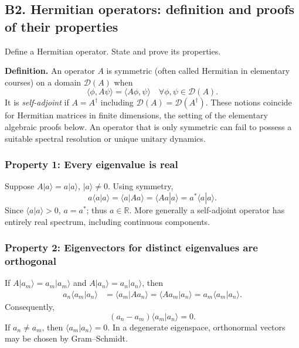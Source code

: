 \documentclass[11pt,a4paper]{article}
\newcommand{\Dom}{\mathcal D}
\newcommand{\R}{\mathbb R}
\begin{document}
\subsection{B2. Hermitian operators: definition and proofs of their properties}
\begin{questionbox}Define a Hermitian operator. State and prove its properties.\end{questionbox}
\textbf{Definition.} An operator $A$ is symmetric (often called Hermitian in elementary courses) on a domain $\Dom(A)$ when
\begin{equation}\label{eq:hermitian}
\langle\phi,A\psi\rangle=\langle A\phi,\psi\rangle
\quad\forall\phi,\psi\in\Dom(A).
\end{equation}
It is \emph{self-adjoint} if $A=A^\dagger$ including $\Dom(A)=\Dom(A^\dagger)$. These notions coincide for Hermitian matrices in finite dimensions, the setting of the elementary algebraic proofs below. An operator that is only symmetric can fail to possess a suitable spectral resolution or unique unitary dynamics.

\subsubsection{Property 1: Every eigenvalue is real}
Suppose $A|a\rangle=a|a\rangle$, $|a\rangle\ne0$. Using symmetry,
\begin{equation}
 a\langle a|a\rangle=\langle a|A a\rangle
=\langle A a|a\rangle=a^*\langle a|a\rangle.
\end{equation}
Since $\langle a|a\rangle>0$, $a=a^*$; thus $\boxed{a\in\R}$. More generally a self-adjoint operator has entirely real spectrum, including continuous components.

\subsubsection{Property 2: Eigenvectors for distinct eigenvalues are orthogonal}
If $A|a_m\rangle=a_m|a_m\rangle$ and $A|a_n\rangle=a_n|a_n\rangle$, then
\begin{align}
a_n\langle a_m|a_n\rangle
&=\langle a_m|A a_n\rangle
=\langle A a_m|a_n\rangle
=a_m\langle a_m|a_n\rangle.
\end{align}
Consequently,
\begin{equation}
(a_n-a_m)\langle a_m|a_n\rangle=0.
\end{equation}
If $a_n\ne a_m$, then $\boxed{\langle a_m|a_n\rangle=0}$. In a degenerate eigenspace, orthonormal vectors may be chosen by Gram--Schmidt.
\end{document}
